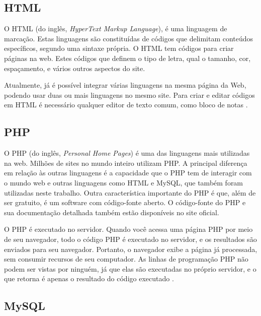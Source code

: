 \documentclass[tcc,capa]{texufpel}
\begin{document}
        \subsection{HTML}
        
            O HTML (do inglês, \textit{HyperText Markup Language}), é uma linguagem de marcação. Estas linguagens são constituídas de códigos que delimitam conteúdos específicos, segundo uma sintaxe própria. O HTML tem códigos para criar páginas na web. Estes códigos que definem o tipo de letra, qual o tamanho, cor, espaçamento, e vários outros aspectos do site.
            
            Atualmente, já é possível integrar várias linguagens na mesma página da Web, podendo usar duas ou mais linguagens no mesmo site.
            Para criar e editar códigos em HTML é necessário qualquer editor de texto comum, como bloco de notas \cite{mazza2012html5}.
        
        \subsection{PHP}
        
            O PHP (do inglês, \textit{Personal Home Pages}) é uma das linguagens mais utilizadas na web. Milhões de sites no mundo  inteiro  utilizam  PHP. A  principal  diferença  em  relação  às  outras linguagens é a capacidade que o PHP tem de interagir com o mundo web e outras linguagens como HTML e MySQL, que também foram utilizadas neste trabalho.
            Outra característica importante do PHP é que, além de ser gratuito, é 
            um software com código-fonte aberto. O código-fonte do PHP e sua documentação detalhada também estão disponíveis no site oficial. 
            
            O PHP é executado no servidor. Quando você acessa uma página PHP por meio de seu navegador, todo o código PHP é executado no servidor, e os resultados são enviados para seu navegador. 
            Portanto, o navegador exibe a página já processada, sem consumir recursos de seu computador. As linhas de programação PHP não podem ser vistas por ninguém, já que elas são executadas no próprio servidor, e o que retorna é apenas o resultado do código executado \cite{niederauer2004desenvolvendo}.
        
        \subsection{MySQL}
        
\end{document}
